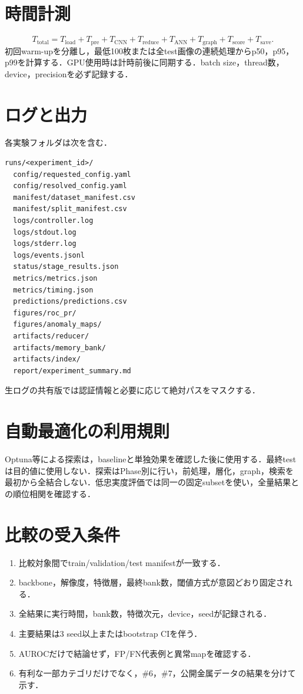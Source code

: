 \documentclass[a4paper,11pt]{ltjsarticle}
\begin{document}
\section{時間計測}
\begin{equation}
T_{\mathrm{total}}=T_{\mathrm{load}}+T_{\mathrm{pre}}+T_{\mathrm{CNN}}+T_{\mathrm{reduce}}+T_{\mathrm{ANN}}+T_{\mathrm{graph}}+T_{\mathrm{score}}+T_{\mathrm{save}}.
\end{equation}
初回warm-upを分離し，最低100枚または全test画像の連続処理からp50，p95，p99を計算する．GPU使用時は計時前後に同期する．batch size，thread数，device，precisionを必ず記録する．

\section{ログと出力}
各実験フォルダは次を含む．
\begin{lstlisting}
runs/<experiment_id>/
  config/requested_config.yaml
  config/resolved_config.yaml
  manifest/dataset_manifest.csv
  manifest/split_manifest.csv
  logs/controller.log
  logs/stdout.log
  logs/stderr.log
  logs/events.jsonl
  status/stage_results.json
  metrics/metrics.json
  metrics/timing.json
  predictions/predictions.csv
  figures/roc_pr/
  figures/anomaly_maps/
  artifacts/reducer/
  artifacts/memory_bank/
  artifacts/index/
  report/experiment_summary.md
\end{lstlisting}
生ログの共有版では認証情報と必要に応じて絶対パスをマスクする．

\section{自動最適化の利用規則}
Optuna等による探索は，baselineと単独効果を確認した後に使用する．最終testは目的値に使用しない．探索はPhase別に行い，前処理，層化，graph，検索を最初から全結合しない．低忠実度評価では同一の固定subsetを使い，全量結果との順位相関を確認する．

\section{比較の受入条件}
\begin{enumerate}
  \item 比較対象間でtrain/validation/test manifestが一致する．
  \item backbone，解像度，特徴層，最終bank数，閾値方式が意図どおり固定される．
  \item 全結果に実行時間，bank数，特徴次元，device，seedが記録される．
  \item 主要結果は3 seed以上またはbootstrap CIを伴う．
  \item AUROCだけで結論せず，FP/FN代表例と異常mapを確認する．
  \item 有利な一部カテゴリだけでなく，\#6，\#7，公開金属データの結果を分けて示す．
\end{enumerate}
\end{document}
